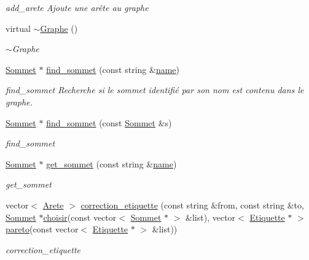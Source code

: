 \begin{DoxyCompactItemize}
\begin{DoxyCompactList}\small\item\em add\+\_\+arete Ajoute une arête au graphe \end{DoxyCompactList}\item 
virtual \hyperlink{class_graphe_a52fe805ae336c72b22b6d755822893b7}{$\sim$\+Graphe} ()
\begin{DoxyCompactList}\small\item\em $\sim$\+Graphe \end{DoxyCompactList}\item 
\hyperlink{class_sommet}{Sommet} $\ast$ \hyperlink{class_graphe_a78c033e49234a57fa86edbdcdc2c0da3}{find\+\_\+sommet} (const string \&\hyperlink{class_graphe_aba29a423311ef239951f6b6c37383444}{name})
\begin{DoxyCompactList}\small\item\em find\+\_\+sommet Recherche si le sommet identifié par son nom est contenu dans le graphe. \end{DoxyCompactList}\item 
\hyperlink{class_sommet}{Sommet} $\ast$ \hyperlink{class_graphe_af629041c83ff0754f0e1a7b3e9db5872}{find\+\_\+sommet} (const \hyperlink{class_sommet}{Sommet} \&s)
\begin{DoxyCompactList}\small\item\em find\+\_\+sommet \end{DoxyCompactList}\item 
\hyperlink{class_sommet}{Sommet} $\ast$ \hyperlink{class_graphe_a76b0a57584e44cbeef0a3563b6ec2751}{get\+\_\+sommet} (const string \&\hyperlink{class_graphe_aba29a423311ef239951f6b6c37383444}{name})
\begin{DoxyCompactList}\small\item\em get\+\_\+sommet \end{DoxyCompactList}\item 
vector$<$ \hyperlink{class_arete}{Arete} $>$ \hyperlink{class_graphe_ab9e88ea6bc8c5d7d4cd580e525e934b5}{correction\+\_\+etiquette} (const string \&from, const string \&to, \hyperlink{class_sommet}{Sommet} $\ast$\hyperlink{tools_8h_a677f6c8bffe4adb8d9d7359fdc40b142}{choisir}(const vector$<$ \hyperlink{class_sommet}{Sommet} $\ast$ $>$ \&list), vector$<$ \hyperlink{class_etiquette}{Etiquette} $\ast$ $>$ \hyperlink{tools_8h_a17cb87cf06a7862e3e44efe3ecdfb2fc}{pareto}(const vector$<$ \hyperlink{class_etiquette}{Etiquette} $\ast$ $>$ \&list))
\begin{DoxyCompactList}\small\item\em correction\+\_\+etiquette \end{DoxyCompactList}\item 

\end{DoxyCompactItemize}
